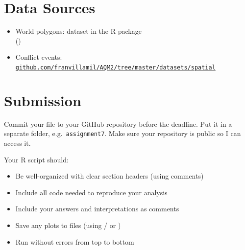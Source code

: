 \vspace{15pt}

\section{Data Sources}

\begin{itemize}
  \item World polygons:  dataset in the  R package\\()
  \item Conflict events: \href{https://github.com/franvillamil/AQM2/tree/master/datasets/spatial}{\texttt{github.com/franvillamil/AQM2/tree/master/datasets/spatial}}
\end{itemize}

\vspace{15pt}

\section{Submission}

Commit your file to your GitHub repository before the deadline. Put it in a separate folder, e.g.\ \texttt{assignment7}. Make sure your repository is public so I can access it.

Your R script should:
\begin{itemize}
  \item Be well-organized with clear section headers (using comments)
  \item Include all code needed to reproduce your analysis
  \item Include your answers and interpretations as comments
  \item Save any plots to files (using / or )
  \item Run without errors from top to bottom
\end{itemize}


